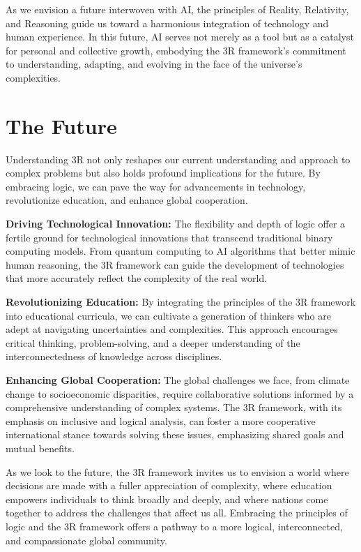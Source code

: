 \documentclass[12pt]{article}
\begin{document}
As we envision a future interwoven with AI, the principles of Reality, Relativity, and Reasoning guide us toward a harmonious integration of technology and human experience. In this future, AI serves not merely as a tool but as a catalyst for personal and collective growth, embodying the 3R framework's commitment to understanding, adapting, and evolving in the face of the universe's complexities.

\section*{The Future}

Understanding 3R not only reshapes our current understanding and approach to complex problems but also holds profound implications for the future. By embracing \qbit{} logic, we can pave the way for advancements in technology, revolutionize education, and enhance global cooperation.

\textbf{Driving Technological Innovation:} The flexibility and depth of \qbit{} logic offer a fertile ground for technological innovations that transcend traditional binary computing models. From quantum computing to AI algorithms that better mimic human reasoning, the 3R framework can guide the development of technologies that more accurately reflect the complexity of the real world.

\textbf{Revolutionizing Education:} By integrating the principles of the 3R framework into educational curricula, we can cultivate a generation of thinkers who are adept at navigating uncertainties and complexities. This approach encourages critical thinking, problem-solving, and a deeper understanding of the interconnectedness of knowledge across disciplines.

\textbf{Enhancing Global Cooperation:} The global challenges we face, from climate change to socioeconomic disparities, require collaborative solutions informed by a comprehensive understanding of complex systems. The 3R framework, with its emphasis on inclusive and logical analysis, can foster a more cooperative international stance towards solving these issues, emphasizing shared goals and mutual benefits.

As we look to the future, the 3R framework invites us to envision a world where decisions are made with a fuller appreciation of complexity, where education empowers individuals to think broadly and deeply, and where nations come together to address the challenges that affect us all. Embracing the principles of \qbit{} logic and the 3R framework offers a pathway to a more logical, interconnected, and compassionate global community.
\end{document}
